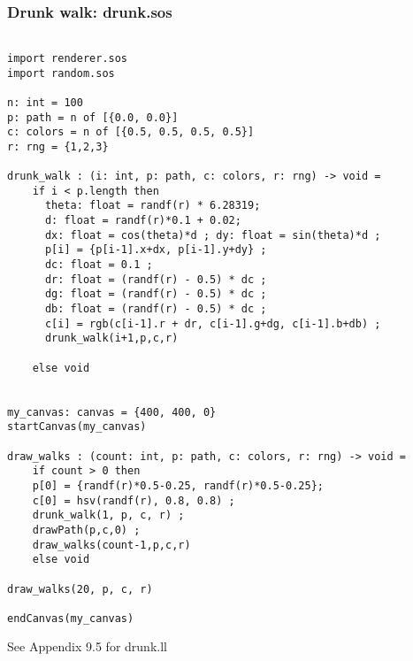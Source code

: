 \documentclass[main.tex]{subfiles}
\begin{document}
\subsubsection{Drunk walk: drunk.sos}
\begin{lstlisting}

import renderer.sos
import random.sos

n: int = 100 
p: path = n of [{0.0, 0.0}]
c: colors = n of [{0.5, 0.5, 0.5, 0.5}]
r: rng = {1,2,3}

drunk_walk : (i: int, p: path, c: colors, r: rng) -> void = 
    if i < p.length then
      theta: float = randf(r) * 6.28319;
      d: float = randf(r)*0.1 + 0.02;
      dx: float = cos(theta)*d ; dy: float = sin(theta)*d ;
      p[i] = {p[i-1].x+dx, p[i-1].y+dy} ;
      dc: float = 0.1 ; 
      dr: float = (randf(r) - 0.5) * dc ;
      dg: float = (randf(r) - 0.5) * dc ;
      db: float = (randf(r) - 0.5) * dc ;
      c[i] = rgb(c[i-1].r + dr, c[i-1].g+dg, c[i-1].b+db) ;
      drunk_walk(i+1,p,c,r)

    else void


my_canvas: canvas = {400, 400, 0}
startCanvas(my_canvas)

draw_walks : (count: int, p: path, c: colors, r: rng) -> void =
    if count > 0 then
    p[0] = {randf(r)*0.5-0.25, randf(r)*0.5-0.25};
    c[0] = hsv(randf(r), 0.8, 0.8) ;
    drunk_walk(1, p, c, r) ;
    drawPath(p,c,0) ;
    draw_walks(count-1,p,c,r)
    else void

draw_walks(20, p, c, r)

endCanvas(my_canvas)
\end{lstlisting}

See Appendix 9.5 for drunk.ll
\end{document}
